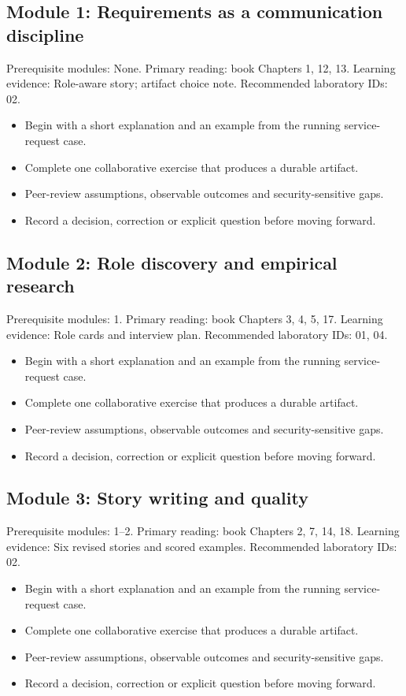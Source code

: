 \documentclass[11pt,letterpaper]{article}
\begin{document}
\subsection{Module 1: Requirements as a communication discipline}
Prerequisite modules: None. Primary reading: book Chapters 1, 12, 13. Learning evidence: Role-aware story; artifact choice note. Recommended laboratory IDs: 02.

\begin{itemize}[leftmargin=*,itemsep=2pt]
\item Begin with a short explanation and an example from the running service-request case.
\item Complete one collaborative exercise that produces a durable artifact.
\item Peer-review assumptions, observable outcomes and security-sensitive gaps.
\item Record a decision, correction or explicit question before moving forward.
\end{itemize}
\subsection{Module 2: Role discovery and empirical research}
Prerequisite modules: 1. Primary reading: book Chapters 3, 4, 5, 17. Learning evidence: Role cards and interview plan. Recommended laboratory IDs: 01, 04.

\begin{itemize}[leftmargin=*,itemsep=2pt]
\item Begin with a short explanation and an example from the running service-request case.
\item Complete one collaborative exercise that produces a durable artifact.
\item Peer-review assumptions, observable outcomes and security-sensitive gaps.
\item Record a decision, correction or explicit question before moving forward.
\end{itemize}
\subsection{Module 3: Story writing and quality}
Prerequisite modules: 1–2. Primary reading: book Chapters 2, 7, 14, 18. Learning evidence: Six revised stories and scored examples. Recommended laboratory IDs: 02.

\begin{itemize}[leftmargin=*,itemsep=2pt]
\item Begin with a short explanation and an example from the running service-request case.
\item Complete one collaborative exercise that produces a durable artifact.
\item Peer-review assumptions, observable outcomes and security-sensitive gaps.
\item Record a decision, correction or explicit question before moving forward.
\end{itemize}
\end{document}
